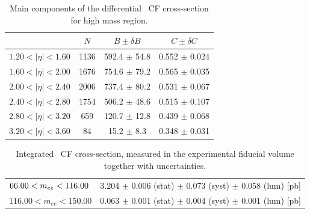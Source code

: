 \begin{table}
\centering
\begin{tabular}{lccc}
\hline
    &   $N$   & $B \pm \delta B$  &  $C \pm \delta C$ \\
\hline
$1.20 < |\eta| <1.60$          & 1136       & 592.4      $\pm$ 54.8 & 0.552      $\pm$ 0.024 \\
$1.60 < |\eta| <2.00$          & 1676       & 754.6      $\pm$ 79.2 & 0.565      $\pm$ 0.035 \\
$2.00 < |\eta| <2.40$          & 2006       & 737.4      $\pm$ 80.2 & 0.531      $\pm$ 0.067 \\
$2.40 < |\eta| <2.80$          & 1754       & 506.2      $\pm$ 48.6 & 0.515      $\pm$ 0.107 \\
$2.80 < |\eta| <3.20$          & 659        & 120.7      $\pm$ 12.8 & 0.439      $\pm$ 0.068 \\
$3.20 < |\eta| <3.60$          & 84         & 15.2       $\pm$ 8.3 & 0.348      $\pm$ 0.031 \\
\hline
\end{tabular}
\caption{Main components of the differential \Zee\ CF cross-section for high mass region.}
\label{tab:Zee_NBC_high}
\end{table}

\begin{table}
\centering
\begin{tabular}{lc}
\hline
$\hfill 66.00 < m_{ee} <116.00$       & 3.204 $\pm$ 0.006 (stat) $\pm$ 0.073 (syst) $\pm$ 0.058 (lum) [pb]  \\
$116.00 < m_{ee} <150.00$      & 0.063 $\pm$ 0.001 (stat) $\pm$ 0.004 (syst) $\pm$ 0.001 (lum) [pb]  \\
\hline
\end{tabular}
\caption{Integrated \Zee\ CF cross-section, measured in the experimental fiducial volume together with uncertainties.}
\label{tab:Zee}
\end{table}

